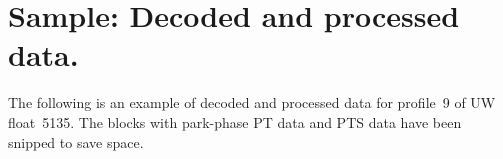 %
%
%
%
%

\section{Sample: Decoded and processed data.}
\label{sec:IridiumProcDataSample}
\renewcommand{\theequation}{\Alph{section}.\arabic{equation}}

The following is an example of decoded and processed data for profile~9 of
UW float~5135.  The blocks with park-phase PT data and PTS data have been
snipped to save space.

